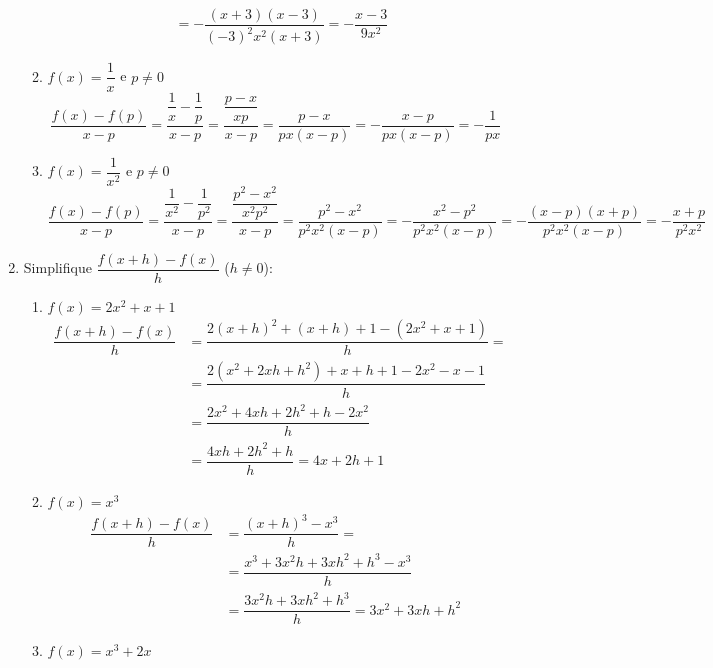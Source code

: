 \begin{enumerate}
\begin{enumerate}
\begin{equation*}
\begin{split}
							  &=-\dfrac{(x+3)(x-3)}{(-3)^2x^2(x+3)}=-\dfrac{x-3}{9x^2}
		\end{split}
		\end{equation*}
		\item %
		$f(x)=\dfrac{1}{x}$ e $p\neq0$
		\begin{equation*}
		\dfrac{f(x)-f(p)}{x-p}=\dfrac{\dfrac{1}{x}-\dfrac{1}{p}}{x-p}=\dfrac{\dfrac{p-x}{xp}}{x-p}=\dfrac{p-x}{px(x-p)}=-\dfrac{x-p}{px(x-p)}=-\dfrac{1}{px}
		\end{equation*}
		\item %
		$f(x)=\dfrac{1}{x^2}$ e $p\neq0$
		\begin{equation*}
		\dfrac{f(x)-f(p)}{x-p}=\dfrac{\dfrac{1}{x^2}-\dfrac{1}{p^2}}{x-p}=\dfrac{\dfrac{p^2-x^2}{x^2p^2}}{x-p}=\dfrac{p^2-x^2}{p^2x^2(x-p)}=-\dfrac{x^2-p^2}{p^2x^2(x-p)}=-\dfrac{(x-p)(x+p)}{p^2x^2(x-p)}=-\dfrac{x+p}{p^2x^2}
		\end{equation*}
	\end{enumerate}
\item %
	Simplifique $\dfrac{f(x+h)-f(x)}{h}$ ($h\neq 0$):
	\begin{enumerate}
		\addtocounter{enumii}{9}
		\item %
		$f(x)=2x^2+x+1$
		\begin{equation*}
		\begin{split}
		\dfrac{f(x+h)-f(x)}{h}&=\dfrac{2(x+h)^2+(x+h)+1-(2x^2+x+1)}{h}=\\
							&= \dfrac{2(x^2+2xh+h^2)+x+h+1-2x^2-x-1}{h}\\
							&=\dfrac{2x^2+4xh+2h^2+h-2x^2}{h}\\
							&=\dfrac{4xh+2h^2+h}{h}=4x+2h+1
		\end{split}
		\end{equation*}
		\addtocounter{enumii}{1}
		\item %
		$f(x)=x^3$
		\begin{equation*}
		\begin{split}
		\dfrac{f(x+h)-f(x)}{h}&=\dfrac{(x+h)^3-x^3}{h}=\\
							   &=\dfrac{x^3+3x^2h+3xh^2+h^3-x^3}{h}\\
							   &=\dfrac{3x^2h+3xh^2+h^3}{h}=3x^2+3xh+h^2
		\end{split}
		\end{equation*}		
		\item %
		$f(x)=x^3+2x$
		\begin{equation*}

\end{equation*}
\end{enumerate}
\end{enumerate}

